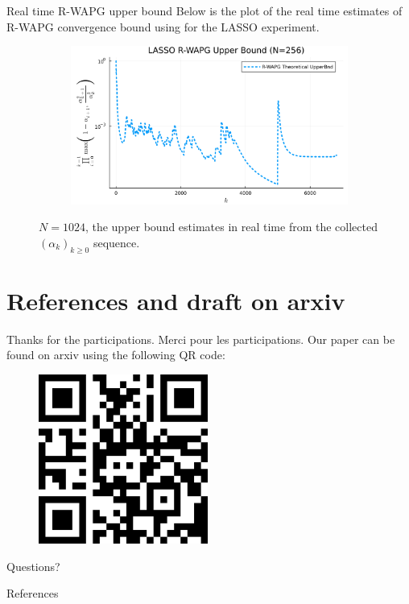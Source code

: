 \documentclass[11pt]{beamer}
\theoremstyle{definition}
\begin{document}
        \begin{frame}{Real time R-WAPG upper bound}
            Below is the plot of the real time estimates of R-WAPG convergence bound using for the LASSO experiment. 
            \begin{figure}[H]
                \centering
                \begin{subfigure}[b]{0.75\textwidth}
                    \centering
                    \includegraphics[width=\textwidth]{
                        assets/lasso_rwapg_upperbnd_256.png
                    }
                \end{subfigure}
                \caption{
                    $N = 1024$, the upper bound estimates in real time from the collected $(\alpha_k)_{k \ge 0}$ sequence. 
                }
                \label{fig:single-lass-r-wapg-rwapg-upperbnd}
            \end{figure}
        \end{frame}

\section{References and draft on arxiv}
    \begin{frame}{Thanks for the participations. Merci pour les participations.}
        Our paper can be found on arxiv using the following QR code: 
        \begin{figure}
            \centering
            \includegraphics[width=15em]{assets/paper-qrcode.png}
        \end{figure}
        Questions?
    \end{frame}
    \begin{frame}{References}        
        
    \end{frame}
\end{document}
